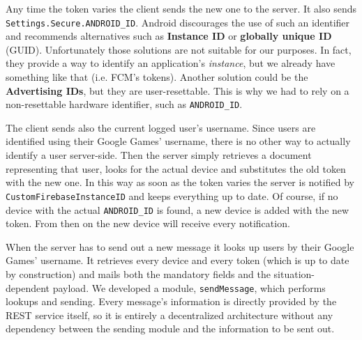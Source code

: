 Any time the token varies the client sends the new one to the server. It also sends \texttt{Settings.Secure.ANDROID\_ID}. Android discourages the use of such an identifier and recommends alternatives such as \textbf{Instance ID} or \textbf{globally unique ID} (GUID). Unfortunately those solutions are not suitable for our purposes. In fact, they provide a way to identify an application's \textit{instance}, but we already have something like that (i.e. FCM's tokens). Another solution could be the \textbf{Advertising IDs}, but they are user-resettable. This is why we had to rely on a non-resettable hardware identifier, such as \texttt{ANDROID\_ID}.

The client sends also the current logged user's username. Since users are identified using their Google Games' username, there is no other way to actually identify a user server-side. Then the server simply retrieves a document representing that user, looks for the actual device and substitutes the old token with the new one. In this way as soon as the token varies the server is notified by \texttt{CustomFirebaseInstanceID} and keeps everything up to date. Of course, if no device with the actual \texttt{ANDROID\_ID} is found, a new device is added with the new token. From then on the new device will receive every notification.

When the server has to send out a new message it looks up users by their Google Games' username. It retrieves every device and every token (which is up to date by construction) and mails both the mandatory fields and the situation-dependent payload. We developed a module, \texttt{sendMessage}, which performs lookups and sending. Every message's information is directly provided by the REST service itself, so it is entirely a decentralized architecture without any dependency between the sending module and the information to be sent out.


